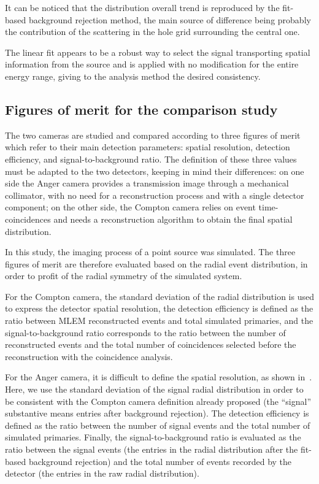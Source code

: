 It can be noticed that the distribution overall trend is reproduced by the fit-based background rejection method, the main source of difference being probably the contribution of the scattering in the hole grid surrounding the central one.

The linear fit appears to be a robust way to select the signal transporting spatial information from the source and is applied with no modification for the entire energy range, giving to the analysis method the desired consistency.

\subsection{Figures of merit for the comparison study}\label{chap5::subsec::fom}

The two cameras are studied and compared according to three figures of merit which refer to their main detection parameters: spatial resolution, detection efficiency, and signal-to-background ratio. The definition of these three values must be adapted to the two detectors, keeping in mind their differences: on one side the Anger camera provides a transmission image through a mechanical collimator, with no need for a reconstruction process and with a single detector component; on the other side, the Compton camera relies on event time-coincidences and needs a reconstruction algorithm to obtain the final spatial distribution.

In this study, the imaging process of a point source was simulated. The three figures of merit are therefore evaluated based on the radial event distribution, in order to profit of the radial symmetry of the simulated system.

For the Compton camera, the standard deviation of the radial distribution is used to express the detector spatial resolution, the detection efficiency is defined as the ratio between MLEM reconstructed events and total simulated primaries, and the signal-to-background ratio corresponds to the ratio between the number of reconstructed events and the total number of coincidences selected before the reconstruction with the coincidence analysis.

For the Anger camera, it is difficult to define the spatial resolution, as shown in~\parencite{Cecchin2015}. Here, we use the standard deviation of the signal radial distribution in order to be consistent with the Compton camera definition already proposed (the \enquote{signal} substantive means entries after background rejection). The detection efficiency is defined as the ratio between the number of signal events and the total number of simulated primaries. Finally, the signal-to-background ratio is evaluated as the ratio between the signal events (the entries in the radial distribution after the fit-based background rejection) and the total number of events recorded by the detector (the entries in the raw radial distribution).

